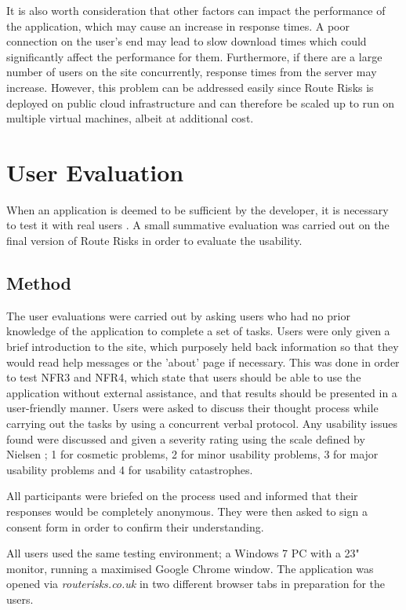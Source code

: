 \documentclass[authoryearcitations]{UoYCSproject}
\begin{document}
It is also worth consideration that other factors can impact the performance of the application, which may cause an increase in response times. A poor connection on the user's end may lead to slow download times which could significantly affect the performance for them. Furthermore, if there are a large number of users on the site concurrently, response times from the server may increase. However, this problem can be addressed easily since Route Risks is deployed on public cloud infrastructure and can therefore be scaled up to run on multiple virtual machines, albeit at additional cost.


\section{User Evaluation}

When an application is deemed to be sufficient by the developer, it is necessary to test it with real users \citep{Cooper2007}. A small summative evaluation was carried out on the final version of Route Risks in order to evaluate the usability. 

\subsection{Method}

The user evaluations were carried out by asking users who had no prior knowledge of the application to complete a set of tasks. Users were only given a brief introduction to the site, which purposely held back information so that they would read help messages or the 'about' page if necessary. This was done in order to test NFR3 and NFR4, which state that users should be able to use the application without external assistance, and that results should be presented in a user-friendly manner. Users were asked to discuss their thought process while carrying out the tasks by using a concurrent verbal protocol. Any usability issues found were discussed and given a severity rating using the scale defined by Nielsen \citep{Nielsen1995}; 1 for cosmetic problems, 2 for minor usability problems, 3 for major usability problems and 4 for usability catastrophes.

All participants were briefed on the process used and informed that their responses would be completely anonymous. They were then asked to sign a consent form in order to confirm their understanding. 

All users used the same testing environment; a Windows 7 PC with a 23" monitor, running a maximised Google Chrome window. The application was opened via \textit{routerisks.co.uk} in two different browser tabs in preparation for the users.
\end{document}
